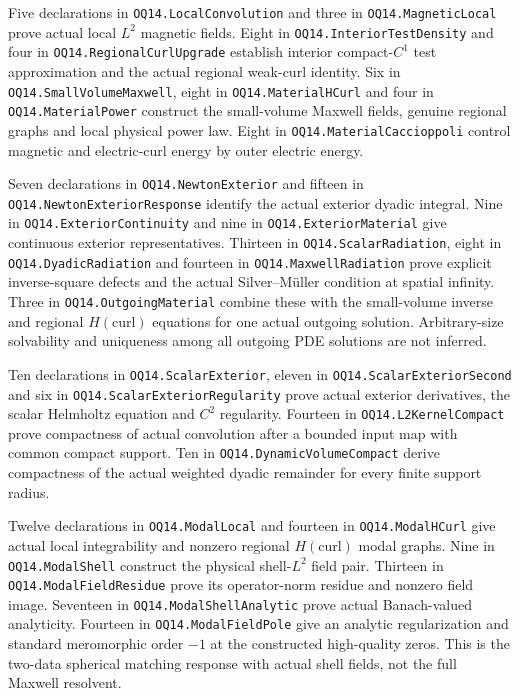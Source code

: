 Five declarations in \texttt{OQ14.}\allowbreak\texttt{LocalConvolution} and three in
\texttt{OQ14.}\allowbreak\texttt{MagneticLocal} prove actual local $L^2$ magnetic fields.
Eight in \texttt{OQ14.}\allowbreak\texttt{InteriorTestDensity} and four in
\texttt{OQ14.}\allowbreak\texttt{RegionalCurlUpgrade} establish interior compact-$C^1$ test
approximation and the actual regional weak-curl identity. Six in
\texttt{OQ14.}\allowbreak\texttt{SmallVolumeMaxwell}, eight in \texttt{OQ14.}\allowbreak\texttt{MaterialHCurl}
and four in \texttt{OQ14.}\allowbreak\texttt{MaterialPower} construct the small-volume
Maxwell fields, genuine regional graphs and local physical power law.
Eight in \texttt{OQ14.}\allowbreak\texttt{MaterialCaccioppoli} control magnetic and
electric-curl energy by outer electric energy.

Seven declarations in \texttt{OQ14.}\allowbreak\texttt{NewtonExterior} and fifteen in
\texttt{OQ14.}\allowbreak\texttt{NewtonExteriorResponse} identify the actual exterior dyadic
integral. Nine in \texttt{OQ14.}\allowbreak\texttt{ExteriorContinuity} and nine in
\texttt{OQ14.}\allowbreak\texttt{ExteriorMaterial} give continuous exterior representatives.
Thirteen in \texttt{OQ14.}\allowbreak\texttt{ScalarRadiation}, eight in
\texttt{OQ14.}\allowbreak\texttt{DyadicRadiation} and fourteen in \texttt{OQ14.}\allowbreak\texttt{MaxwellRadiation}
prove explicit inverse-square defects and the actual Silver--M\"uller
condition at spatial infinity. Three in \texttt{OQ14.}\allowbreak\texttt{OutgoingMaterial}
combine these with the small-volume inverse and regional $H(\mathrm{curl})$
equations for one actual outgoing solution. Arbitrary-size solvability and
uniqueness among all outgoing PDE solutions are not inferred.

Ten declarations in \texttt{OQ14.}\allowbreak\texttt{ScalarExterior}, eleven in
\texttt{OQ14.}\allowbreak\texttt{ScalarExteriorSecond} and six in
\texttt{OQ14.}\allowbreak\texttt{ScalarExteriorRegularity} prove actual exterior derivatives,
the scalar Helmholtz equation and $C^2$ regularity. Fourteen in
\texttt{OQ14.}\allowbreak\texttt{L2KernelCompact} prove compactness of actual convolution
after a bounded input map with common compact support. Ten in
\texttt{OQ14.}\allowbreak\texttt{DynamicVolumeCompact} derive compactness of the actual
weighted dyadic remainder for every finite support radius.

Twelve declarations in \texttt{OQ14.}\allowbreak\texttt{ModalLocal} and fourteen in
\texttt{OQ14.}\allowbreak\texttt{ModalHCurl} give actual local integrability and nonzero
regional $H(\mathrm{curl})$ modal graphs. Nine in \texttt{OQ14.}\allowbreak\texttt{ModalShell}
construct the physical shell-$L^2$ field pair. Thirteen in
\texttt{OQ14.}\allowbreak\texttt{ModalFieldResidue} prove its operator-norm residue and
nonzero field image. Seventeen in \texttt{OQ14.}\allowbreak\texttt{ModalShellAnalytic} prove
actual Banach-valued analyticity. Fourteen in \texttt{OQ14.}\allowbreak\texttt{ModalFieldPole}
give an analytic regularization and standard meromorphic order $-1$ at
the constructed high-quality zeros. This is the two-data spherical
matching response with actual shell fields, not the full Maxwell resolvent.

